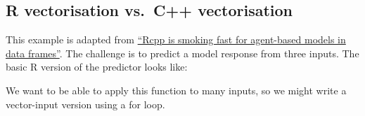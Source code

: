 \hypertarget{r-vectorisation-vs.c-vectorisation}{%
\subsection{R vectorisation vs.~C++
vectorisation}\label{r-vectorisation-vs.c-vectorisation}}

This example is adapted from
\href{http://www.babelgraph.org/wp/?p=358}{``Rcpp is smoking fast for
agent-based models in data frames''}. The challenge is to predict a
model response from three inputs. The basic R version of the predictor
looks like:

\begin{Shaded}
\begin{Highlighting}[]
\StringTok{ }
\StringTok{ } \OperatorTok{+}\StringTok{ } \OperatorTok{*}\StringTok{ } \OperatorTok{/}\StringTok{ }\NormalTok{(} \OperatorTok{-}\StringTok{ }\NormalTok{(} \OperatorTok{*}\StringTok{ }\OperatorTok{+}\StringTok{ } \OperatorTok{*}\StringTok{ }
\StringTok{ }\OperatorTok{*}\StringTok{ }  
\StringTok{ }\NormalTok{(}
\StringTok{ }\NormalTok{(}
\NormalTok{\}}
\end{Highlighting}
\end{Shaded}

We want to be able to apply this function to many inputs, so we might
write a vector-input version using a for loop.

\begin{Shaded}
\begin{Highlighting}[]
\StringTok{ }
\StringTok{ }
\StringTok{ }
   
\StringTok{ }
\NormalTok{  \}}
\NormalTok{\}}
\end{Highlighting}
\end{Shaded}

